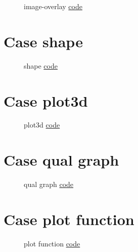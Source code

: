 \documentclass{article}
\begin{document}
\begin{figure}[H]
	\centering
	
	\caption{image-overlay \href{https:/github.com/cauliyang/learn_tikz/blob/main/source/image-overlay.tex}{code} }
	\label{fig:image-overlay}
\end{figure}

\section{Case shape}

\begin{figure}[H]
	\centering
	
	\caption{shape \href{https:/github.com/cauliyang/learn_tikz/blob/main/source/shape.tex}{code} }
	\label{fig:shape}
\end{figure}

\section{Case plot3d}

\begin{figure}[H]
	\centering
	
	\caption{plot3d \href{https:/github.com/cauliyang/learn_tikz/blob/main/source/plot3d.tex}{code} }
	\label{fig:plot3d}
\end{figure}

\section{Case qual graph}

\begin{figure}[H]
	\centering
	
	\caption{qual graph \href{https:/github.com/cauliyang/learn_tikz/blob/main/source/qual_graph.tex}{code} }
	\label{fig:qual graph}
\end{figure}

\section{Case plot function}

\begin{figure}[H]
	\centering
	
	\caption{plot function \href{https:/github.com/cauliyang/learn_tikz/blob/main/source/plot_function.tex}{code} }
	\label{fig:plot function}
\end{figure}
\end{document}
